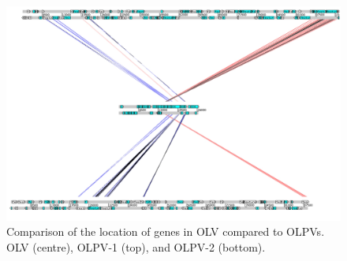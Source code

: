 \begin{figure}
\includegraphics[width=\textwidth]{olv_figures/OLV_OLPV_compare.jpg}
\caption[Comparison of the location of genes in \ac{OLV} compared to \acp{OLPV}]{Comparison of the location of genes in \ac{OLV} compared to \acp{OLPV}. \ac{OLV} (centre), \ac{OLPV}-1 (top), and \ac{OLPV}-2 (bottom).
}
\label{fig:OLV_OLPV_compare}

\end{figure}
